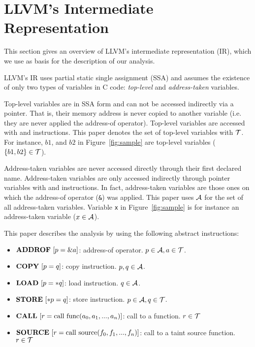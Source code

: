 \section{LLVM's Intermediate Representation}\label{sec:llvm}

This section gives an overview of LLVM's intermediate
representation (IR), which we use as basis for the
description of our analysis.

LLVM's IR uses partial static single assignment (SSA)
and assumes the existence of only two types of variables
in C code: \textit{top-level} and \textit{address-taken}
variables.

Top-level variables are in SSA form and can not be
accessed indirectly via a pointer. That is, their memory
address is never copied to another variable (i.e. they are
never applied the address-of operator). Top-level variables
are accessed with \alloct and \copyt instructions.
This paper denotes the set of top-level variables
with $\mathcal{T}$. For instance, $b1$, and $b2$ in Figure~\ref{fig:sample}
are top-level variables ($\{b1, b2\} \in \mathcal{T}$).

Address-taken variables are never accessed directly through
their first declared name. Address-taken variables are only
accessed indirectly through pointer variables with \loadt and
\storet instructions. In fact, address-taken variables
are those ones on which the address-of operator (\texttt{\&})
was applied. This paper uses $\mathcal{A}$ for the set of all address-taken
variables. Variable \texttt{x} in Figure~\ref{fig:sample} is
for instance an address-taken variable ($x \in \mathcal{A}$).

This paper describes the analysis by using the following abstract
instructions:
\begin{itemize}
\item $\text{\textbf{ADDROF}}\ [p = \&a]$: address-of operator. $p \in \mathcal{A}, a \in \mathcal{T}$.
\item $\text{\textbf{COPY}}\ [p = q]$: copy instruction. $p, q \in \mathcal{A}$.
\item $\text{\textbf{LOAD}}\ [p = *q]$: load instruction. $q \in \mathcal{A}$.
\item $\text{\textbf{STORE}}\ [*p = q]$: store instruction. $p \in \mathcal{A}, q \in \mathcal{T}$.
\item $\text{\textbf{CALL}}\ [r = \text{call}\ \text{func}(a_0, a_1, ..., a_n)]$: call to a function. $r \in \mathcal{T}$
\item $\text{\textbf{SOURCE}}\ [r = \text{call}\ \text{source}(f_0, f_1, ..., f_n)]$: call to a taint source function. $r \in \mathcal{T}$
\end{itemize}
